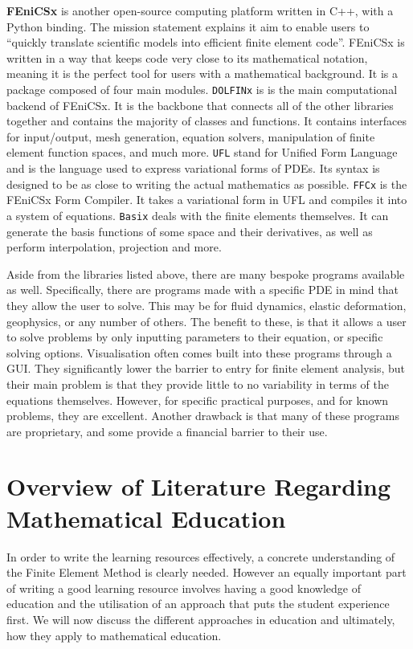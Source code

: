 \textbf{FEniCSx} \cite{fenics} is another open-source computing platform written in C++, with a Python binding. The mission statement explains it aim to enable users to ``quickly translate scientific models into efficient finite element code''. FEniCSx is written in a way that keeps code very close to its mathematical notation, meaning it is the perfect tool for users with a mathematical background. It is a package composed of four main modules. \texttt{DOLFINx} is is the main computational backend of FEniCSx. It is the backbone that connects all of the other libraries together and contains the majority of classes and functions. It contains interfaces for input/output, mesh generation, equation solvers, manipulation of finite element function spaces, and much more. \texttt{UFL} stand for Unified Form Language and is the language used to express variational forms of PDEs. Its syntax is designed to be as close to writing the actual mathematics as possible. \texttt{FFCx} is the FEniCSx Form Compiler. It takes a variational form in UFL and compiles it into a system of equations. \texttt{Basix} deals with the finite elements themselves. It can generate the basis functions of some space and their derivatives, as well as perform interpolation, projection and more.

\pagebreak

Aside from the libraries listed above, there are many bespoke programs available as well. Specifically, there are programs made with a specific PDE in mind that they allow the user to solve. This may be for fluid dynamics, elastic deformation, geophysics, or any number of others. The benefit to these, is that it allows a user to solve problems by only inputting parameters to their equation, or specific solving options. Visualisation often comes built into these programs through a GUI. They significantly lower the barrier to entry for finite element analysis, but their main problem is that they provide little to no variability in terms of the equations themselves. However, for specific practical purposes, and for known problems, they are excellent. Another drawback is that many of these programs are proprietary, and some provide a financial barrier to their use.

\section{Overview of Literature Regarding Mathematical Education}

In order to write the learning resources effectively, a concrete understanding of the Finite Element Method is clearly needed. However an equally important part of writing a good learning resource involves having a good knowledge of education and the utilisation of an approach that puts the student experience first. We will now discuss the different approaches in education and ultimately, how they apply to mathematical education.

